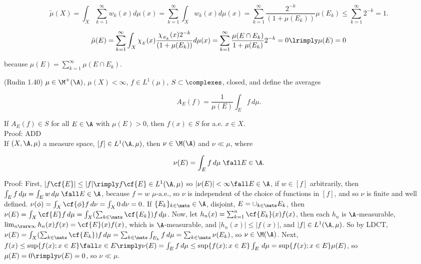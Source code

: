 $$
    \tilde{\mu}(X) =  \int_X \sum_{k=1}^\infty w_k(x) d\mu(x) =  \sum_{k=1}^\infty  \int_X w_k(x) d\mu(x) =  \sum_{k=1}^\infty   \frac{2^{-k}}{ (1+\mu(E_k))}     \mu(E_k) \le \sum_{k=1}^\infty 2^{-k} = 1.
$$

$$
    \tilde{\mu}(E) =  \sum_{k=1}^\infty  \int_X \chi_{_{E}}(x) \frac{ \chi_{_{E_k}}(x)  2^{-k}}{ (1+\mu(E_k))} d\mu(x) = \sum_{k=1}^\infty \frac{ \mu(E \cap E_k ) }{ 1+\mu(E_k)} 2^{-k} = 0 \lrimply \mu(E) = 0
$$

\noindent
because $\mu(E) = \sum_{k=1}^\infty \mu(E \cap E_k)$.


\vspace{20pt}

(Rudin 1.40) $\mu \in \M^+(\A)$, $\mu(X) < \infty$, $f \in L^1(\mu)$, $S \subset \complexes$, closed, and define the averages

$$
A_E(f) = \frac{1}{\mu(E)}  \int_E f \, d\mu.
$$

\noindent
If $A_E(f) \in S$ for all $E \in \A$ with $\mu(E) > 0$, then $f(x) \in S$ for a.e. $x \in X$.\\


\noindent
Proof: ADD \\








If $(X, \A, \mu)$ a measure space, $[f] \in L^1(\A,\mu)$, then $\nu \in \M(\A)$ and $\nu \ll \mu$, where

$$ \nu(E) = \int_E f \, d\mu \; \fall E \in \A.$$

\noindent
Proof: First, $|f \cf{E}| \le |f| \rimply f \cf{E} \in  L^1(\A,\mu)$ so $|\nu(E)| < \infty \fall E \in \A$, if $w \in [f]$ arbitrarily, then $\int_E f \, d\mu = \int_E w \, d\mu  \; \fall E \in \A $, because $f = w$ $\mu$-a.e., so $\nu$ is independent of the choice of functions in $[f]$, and so $\nu$ is finite and well defined. $\nu(\phi) = \int_X \cf{\phi} f \, d\nu = \int_X 0 \, d\nu = 0$. If $\{ E_k \}_{k \in \nats} \in \A$, disjoint, $E  = \cup_{k \in \nats} E_k$, then $\nu(E) = \int_X \cf{E} f \, d\mu = \int_X ( \sum_{k \in \nats} \cf{E_k} ) f \, d\mu$. Now, let $h_n(x) = \sum_{k=1}^n \cf{E_k}(x) f(x)$, then each $h_n$ is $\A$-measurable, $\lim_{n \rarw \infty} h_n(x) f(x) = \cf{E}(x) f(x)$, which is $\A$-measurable, and $|h_n(x)| \le |f(x)|$, and $|f| \in L^1(\A, \mu)$. So by LDCT, $\nu(E) = \int_X ( \sum_{k \in \nats} \cf{E_k} ) f \, d\mu  =  \sum_{k \in \nats} \int_{E_k}  f \, d\mu = \sum_{k \in \nats} \nu(E_k)$, so $\nu \in \M(\A)$. Next, $f(x) \le \sup \{ f(x); x \in E \} \fall x \in E \rimply \nu(E) = \int_E f \, d\mu \le \sup \{ f(x); x \in E \} \int_E \, d\mu = \sup \{ f(x); x \in E \} \mu(E)$, so $\mu(E) = 0 \rimply \nu(E) = 0$, so $\nu \ll \mu$.








